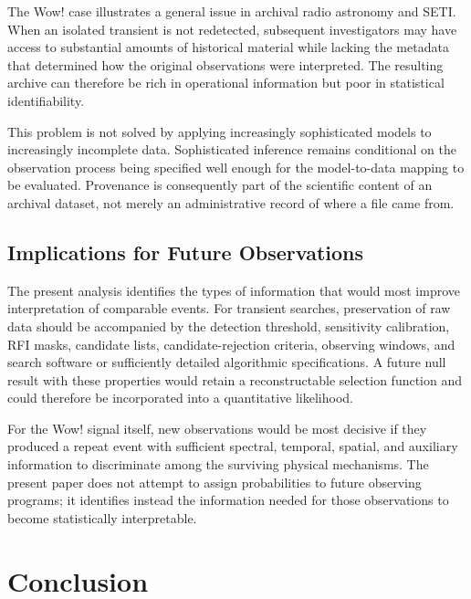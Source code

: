 \documentclass[twocolumn]{aastex701}
\begin{document}
The Wow! case illustrates a general issue in archival radio astronomy and SETI. When an isolated transient is not redetected, subsequent investigators may have access to substantial amounts of historical material while lacking the metadata that determined how the original observations were interpreted. The resulting archive can therefore be rich in operational information but poor in statistical identifiability.

This problem is not solved by applying increasingly sophisticated models to increasingly incomplete data. Sophisticated inference remains conditional on the observation process being specified well enough for the model-to-data mapping to be evaluated. Provenance is consequently part of the scientific content of an archival dataset, not merely an administrative record of where a file came from.

\subsection{Implications for Future Observations}

The present analysis identifies the types of information that would most improve interpretation of comparable events. For transient searches, preservation of raw data should be accompanied by the detection threshold, sensitivity calibration, RFI masks, candidate lists, candidate-rejection criteria, observing windows, and search software or sufficiently detailed algorithmic specifications. A future null result with these properties would retain a reconstructable selection function and could therefore be incorporated into a quantitative likelihood.

For the Wow! signal itself, new observations would be most decisive if they produced a repeat event with sufficient spectral, temporal, spatial, and auxiliary information to discriminate among the surviving physical mechanisms. The present paper does not attempt to assign probabilities to future observing programs; it identifies instead the information needed for those observations to become statistically interpretable.


\section{Conclusion}
\label{sec:conclusion}
\end{document}
